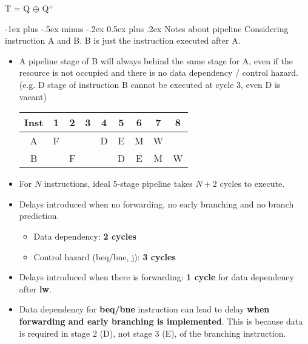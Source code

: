\documentclass[a4paper]{article}
\makeatletter
\renewcommand{\section}{\@startsection{section}{1}{0mm}%
	{-1ex plus -.5ex minus -.2ex}%
	{0.5ex plus .2ex}%
	{\normalfont\large\bfseries}}
\makeatother
\begin{document}
\begin{justifying}
\begin{multicols}{2}
\begin{multicols}{2}
\begin{center}
                    T = Q $\oplus$ Q$^+$
                \end{center}
            \end{multicols}
            
            
            \section{Notes about pipeline}
            Considering instruction A and B. B is just the instruction executed after A.
            \begin{itemize}
                \item A pipeline stage of B will always behind the same stage for A, even if the resource is not occupied and there is no data dependency / control hazard. (e.g. D stage of instruction B cannot be executed at cycle 3, even D is vacant)
                \begin{center}
                    \begin{tabular}{c|cccccccc}
                        Inst & 1 & 2 & 3 & 4 & 5 & 6 & 7 & 8 \\
                        \hline
                        A    & F &   &   & D & E & M & W &   \\
                        B    &   & F &   &   & D & E & M & W \\
                    \end{tabular}
                \end{center}
                \item For $N$ instructions, ideal 5-stage pipeline takes $N+2$ cycles to execute.
                \item Delays introduced when no forwarding, no early branching and no branch prediction.
                \begin{itemize}
                    \item Data dependency: \textbf{2 cycles}
                    \item Control hazard (beq/bne, j): \textbf{3 cycles}
                \end{itemize}
                \item Delays introduced when there is forwarding: \textbf{1 cycle} for data dependency after \textbf{lw}.
                \item Data dependency for \textbf{beq/bne} instruction can lead to delay \textbf{when forwarding and early branching is implemented}. This is because data is required in stage 2 (D), not stage 3 (E), of the branching instruction.

\end{itemize}
\end{multicols}
\end{justifying}
\end{document}
